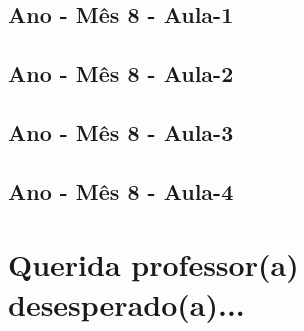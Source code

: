 \begin{multicols}{2}
\section[\sffamily 5\textordmasculine\space Ano - M\^{e}s 8 - Aula-1]{\textordmasculine\space Ano - M\^{e}s 8 - Aula-1}


\section[\sffamily 5\textordmasculine\space Ano - M\^{e}s 8 - Aula-2]{\textordmasculine\space Ano - M\^{e}s 8 - Aula-2}


\section[\sffamily 5\textordmasculine\space Ano - M\^{e}s 8 - Aula-3]{\textordmasculine\space Ano - M\^{e}s 8 - Aula-3}


\section[\sffamily 5\textordmasculine\space Ano - M\^{e}s 8 - Aula-4]{\textordmasculine\space Ano - M\^{e}s 8 - Aula-4}


\end{multicols}


\chapter[ Querida professor(a) desesperado(a)...]{Querida professor(a) desesperado(a)...}


